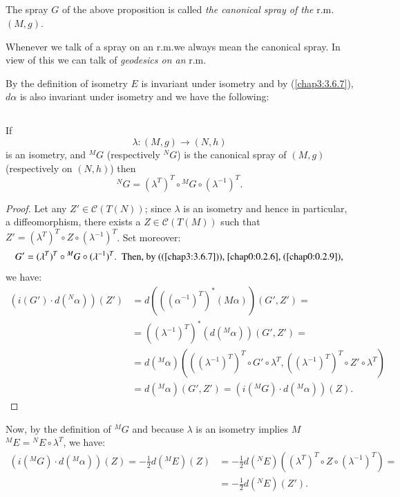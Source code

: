 \subsection{}\label{chap4:defi4.2.3}

\begin{defi*}
The spray $G$ of the above proposition is called {\em the canonical
  spray of the} r.m.\@ $(M,g)$.
\end{defi*}

Whenever we talk of a spray on an r.m.\@ we always mean the canonical
spray. In view of this we can talk of {\em geodesics on an} r.m.

By the definition of isometry $E$ is invariant under isometry and by
(\ref{chap3:3.6.7}), $d\alpha$ is also invariant under isometry and we have
the following:

\subsection{}\label{chap4:4.2.4}

\begin{prop*}
If\pageoriginale
$$
\lambda:(M,g)\to (N,h)
$$
is an isometry, and ${}^{M}G$ (respectively ${}^{N}G$) is the
canonical spray of $(M,g)$ (respectively on $(N,h)$) then
$$
{}^{N}G=(\lambda^{T})^{T}\circ {}^{M}G\circ(\lambda^{-1})^{T}.
$$
\end{prop*}

\begin{proof}
Let any $Z'\in\mathscr{C}(T(N))$; since $\lambda$ is an isometry and
hence in particular, a diffeomorphism, there exists a
$Z\in\mathscr{C}(T(M))$ such that $Z'=(\lambda^{T})^{T}\circ Z\circ
(\lambda^{-1})^{T}$. Set moreover:
$$
G'=(\lambda^{T})^{T}\circ {}^{M}G\circ(\lambda^{-1})^{T}.\text{
  \ Then, by ((\ref{chap3:3.6.7})), \eqref{chap0:0.2.6}, (\ref{chap0:0.2.9}),}  
$$
we have:
\begin{align*}
(i(G')\cdot d({}^{N}\alpha))(Z') &=
d(((\alpha^{-1})^{T})^{\ast}(M\alpha))(G',Z')=\\
&= ((\lambda^{-1})^{T})^{\ast}(d({}^{M}\alpha))(G',Z')=\\
&= d({}^{M}\alpha)(((\lambda^{-1})^{T})^{T}\circ G'\circ
\lambda^{T},((\lambda^{-1})^{T})^{T}\circ Z'\circ \lambda^{T})\\
&= d({}^{M}\alpha)(G',Z')=(i({}^{M}G)\cdot d({}^{M}\alpha))(Z).
\end{align*}
\end{proof}
Now, by the definition of ${}^{M}G$ and because $\lambda$ is an
isometry implies $M$ ${}^{M}E={}^{N}E\circ\lambda^{T}$, we have:
\begin{align*}
(i({}^{M}G)\cdot d({}^{M}\alpha))(Z)=-\frac{1}{2}d({}^{M}E)(Z) &=
  -\frac{1}{2}d({}^{N}E)((\lambda^{T})^{T}\circ Z\circ
  (\lambda^{-1})^{T})=\\
&=-\frac{1}{2}d({}^{N}E)(Z').
\end{align*}

